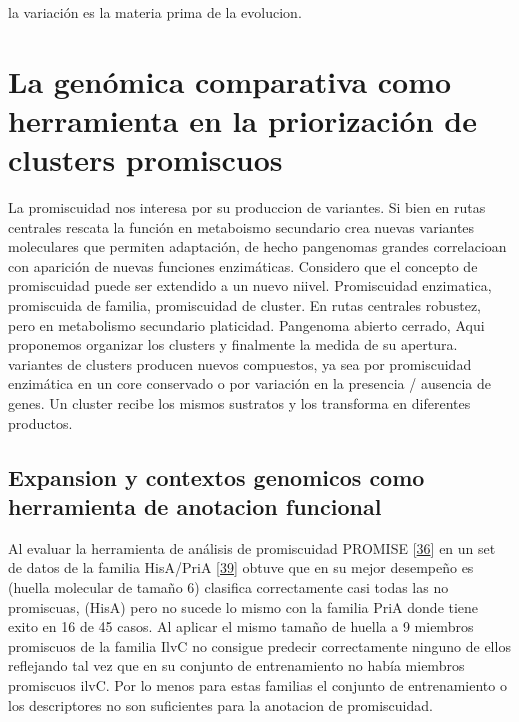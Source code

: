 \documentclass[12pt,twoside]{reedthesis}
\begin{document}
  la variación es la materia prima de la evolucion.
  
  \section{La genómica comparativa como herramienta en la priorización de
  clusters
  promiscuos}\label{la-genomica-comparativa-como-herramienta-en-la-priorizacion-de-clusters-promiscuos}
  
  La promiscuidad nos interesa por su produccion de variantes. Si bien en
  rutas centrales rescata la función en metaboismo secundario crea nuevas
  variantes moleculares que permiten adaptación, de hecho pangenomas
  grandes correlacioan con aparición de nuevas funciones enzimáticas.
  Considero que el concepto de promiscuidad puede ser extendido a un nuevo
  niivel. Promiscuidad enzimatica, promiscuida de familia, promiscuidad de
  cluster. En rutas centrales robustez, pero en metabolismo secundario
  platicidad. Pangenoma abierto cerrado, Aqui proponemos organizar los
  clusters y finalmente la medida de su apertura. variantes de clusters
  producen nuevos compuestos, ya sea por promiscuidad enzimática en un
  core conservado o por variación en la presencia / ausencia de genes. Un
  cluster recibe los mismos sustratos y los transforma en diferentes
  productos.
  
  \subsection{Expansion y contextos genomicos como herramienta de
  anotacion
  funcional}\label{expansion-y-contextos-genomicos-como-herramienta-de-anotacion-funcional}
  
  Al evaluar la herramienta de análisis de promiscuidad PROMISE
  {[}\protect\hyperlink{ref-carbonell_molecular_2010}{36}{]} en un set de
  datos de la familia HisA/PriA
  {[}\protect\hyperlink{ref-noda-garcia_insights_2015}{39}{]} obtuve que
  en su mejor desempeño es (huella molecular de tamaño 6) clasifica
  correctamente casi todas las no promiscuas, (HisA) pero no sucede lo
  mismo con la familia PriA donde tiene exito en 16 de 45 casos. Al
  aplicar el mismo tamaño de huella a 9 miembros promiscuos de la familia
  IlvC no consigue predecir correctamente ninguno de ellos reflejando tal
  vez que en su conjunto de entrenamiento no había miembros promiscuos
  ilvC. Por lo menos para estas familias el conjunto de entrenamiento o
  los descriptores no son suficientes para la anotacion de promiscuidad.
  
\end{document}
